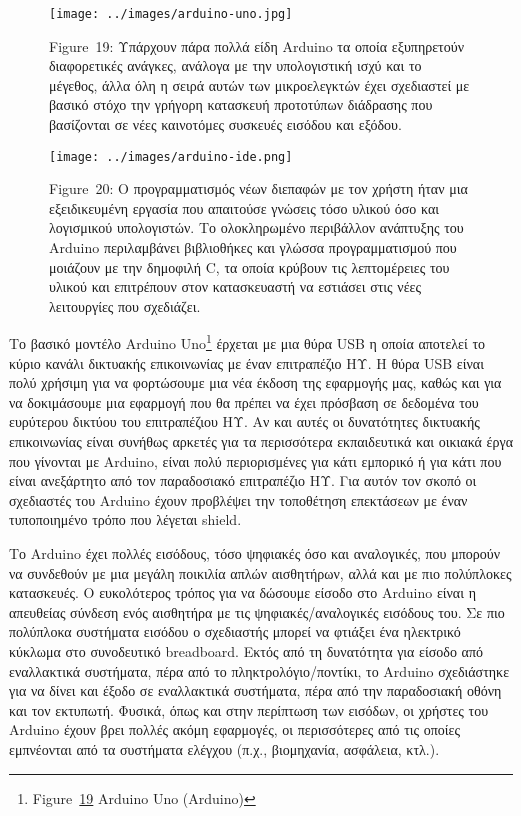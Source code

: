 \documentclass[
]{article}
\begin{document}
\leavevmode{}%
\begin{figure}
\hypertarget{fig:arduino-uno}{%
\centering
\texttt{[image: ../images/arduino-uno.jpg]}
\caption{Figure~19: Υπάρχουν πάρα πολλά είδη Arduino τα οποία
εξυπηρετούν διαφορετικές ανάγκες, ανάλογα με την υπολογιστική ισχύ και
το μέγεθος, άλλα όλη η σειρά αυτών των μικροελεγκτών έχει σχεδιαστεί με
βασικό στόχο την γρήγορη κατασκευή προτοτύπων διάδρασης που βασίζονται
σε νέες καινοτόμες συσκευές εισόδου και εξόδου.}\label{fig:arduino-uno}
}
\end{figure}

\leavevmode{}%
\begin{figure}
\hypertarget{fig:arduino-ide}{%
\centering
\texttt{[image: ../images/arduino-ide.png]}
\caption{Figure~20: Ο προγραμματισμός νέων διεπαφών με τον χρήστη ήταν
μια εξειδικευμένη εργασία που απαιτούσε γνώσεις τόσο υλικού όσο και
λογισμικού υπολογιστών. Το ολοκληρωμένο περιβάλλον ανάπτυξης του Arduino
περιλαμβάνει βιβλιοθήκες και γλώσσα προγραμματισμού που μοιάζουν με την
δημοφιλή C, τα οποία κρύβουν τις λεπτομέρειες του υλικού και επιτρέπουν
στον κατασκευαστή να εστιάσει στις νέες λειτουργίες που
σχεδιάζει.}\label{fig:arduino-ide}
}
\end{figure}

Το βασικό μοντέλο Arduino Uno\footnote{Figure~\protect\hyperlink{fig:arduino-uno}{19}
  Arduino Uno (Arduino)} έρχεται με μια θύρα USB η οποία αποτελεί το
κύριο κανάλι δικτυακής επικοινωνίας με έναν επιτραπέζιο ΗΥ. Η θύρα USB
είναι πολύ χρήσιμη για να φορτώσουμε μια νέα έκδοση της εφαρμογής μας,
καθώς και για να δοκιμάσουμε μια εφαρμογή που θα πρέπει να έχει πρόσβαση
σε δεδομένα του ευρύτερου δικτύου του επιτραπέζιου ΗΥ. Αν και αυτές οι
δυνατότητες δικτυακής επικοινωνίας είναι συνήθως αρκετές για τα
περισσότερα εκπαιδευτικά και οικιακά έργα που γίνονται με Arduino, είναι
πολύ περιορισμένες για κάτι εμπορικό ή για κάτι που είναι ανεξάρτητο από
τον παραδοσιακό επιτραπέζιο ΗΥ. Για αυτόν τον σκοπό οι σχεδιαστές του
Arduino έχουν προβλέψει την τοποθέτηση επεκτάσεων με έναν τυποποιημένο
τρόπο που λέγεται shield.

Το Arduino έχει πολλές εισόδους, τόσο ψηφιακές όσο και αναλογικές, που
μπορούν να συνδεθούν με μια μεγάλη ποικιλία απλών αισθητήρων, αλλά και
με πιο πολύπλοκες κατασκευές. Ο ευκολότερος τρόπος για να δώσουμε είσοδο
στο Arduino είναι η απευθείας σύνδεση ενός αισθητήρα με τις
ψηφιακές/αναλογικές εισόδους του. Σε πιο πολύπλοκα συστήματα εισόδου ο
σχεδιαστής μπορεί να φτιάξει ένα ηλεκτρικό κύκλωμα στο συνοδευτικό
breadboard. Εκτός από τη δυνατότητα για είσοδο από εναλλακτικά
συστήματα, πέρα από το πληκτρολόγιο/ποντίκι, το Arduino σχεδιάστηκε για
να δίνει και έξοδο σε εναλλακτικά συστήματα, πέρα από την παραδοσιακή
οθόνη και τον εκτυπωτή. Φυσικά, όπως και στην περίπτωση των εισόδων, οι
χρήστες του Arduino έχουν βρει πολλές ακόμη εφαρμογές, οι περισσότερες
από τις οποίες εμπνέονται από τα συστήματα ελέγχου (π.χ., βιομηχανία,
ασφάλεια, κτλ.).
\end{document}
